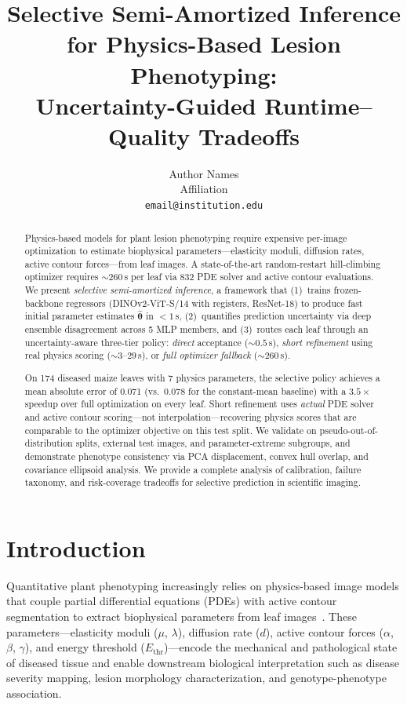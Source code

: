 \documentclass[11pt,a4paper]{article}
\title{Selective Semi-Amortized Inference for Physics-Based Lesion Phenotyping:\\
Uncertainty-Guided Runtime--Quality Tradeoffs}
\author{
  Author Names\\
  Affiliation\\
  \texttt{email@institution.edu}
}
\date{}
\newcommand{\btheta}{\boldsymbol{\theta}}
\begin{document}
\maketitle

\begin{abstract}
Physics-based models for plant lesion phenotyping require expensive per-image optimization
to estimate biophysical parameters---elasticity moduli, diffusion rates, active contour
forces---from leaf images. A state-of-the-art random-restart hill-climbing optimizer
requires ${\sim}260$\,s per leaf via 832 PDE solver and active contour evaluations.
We present \emph{selective semi-amortized inference}, a framework that
(1)~trains frozen-backbone regressors (DINOv2-ViT-S/14 with registers, ResNet-18) to produce
fast initial parameter estimates $\hat{\btheta}$ in $<1$\,s,
(2)~quantifies prediction uncertainty via deep ensemble disagreement across 5 MLP members, and
(3)~routes each leaf through an uncertainty-aware three-tier policy:
\emph{direct} acceptance (${\sim}0.5$\,s),
\emph{short refinement} using real physics scoring (${\sim}3$--$29$\,s), or
\emph{full optimizer fallback} (${\sim}260$\,s).

On 174 diseased maize leaves with 7 physics parameters,
the selective policy achieves a mean absolute error of 0.071
(vs.\ 0.078 for the constant-mean baseline) with a $3.5\times$ speedup over
full optimization on every leaf. Short refinement uses \emph{actual} PDE solver
and active contour scoring---not interpolation---recovering physics scores
that are comparable to the optimizer objective on this test split.
We validate on pseudo-out-of-distribution splits, external test images,
and parameter-extreme subgroups, and demonstrate phenotype consistency
via PCA displacement, convex hull overlap, and covariance ellipsoid analysis.
We provide a complete analysis of calibration, failure taxonomy,
and risk-coverage tradeoffs for selective prediction in scientific imaging.
\end{abstract}

\section{Introduction}
\label{sec:intro}

Quantitative plant phenotyping increasingly relies on physics-based image models
that couple partial differential equations (PDEs) with active contour segmentation
to extract biophysical parameters from leaf images~\cite{singh2021plantdoc,mahlein2016plant}.
These parameters---elasticity moduli ($\mu$, $\lambda$), diffusion rate ($d$),
active contour forces ($\alpha$, $\beta$, $\gamma$), and energy threshold ($E_\text{thr}$)---encode
the mechanical and pathological state of diseased tissue and enable
downstream biological interpretation such as disease severity mapping,
lesion morphology characterization, and genotype-phenotype association.
\end{document}
